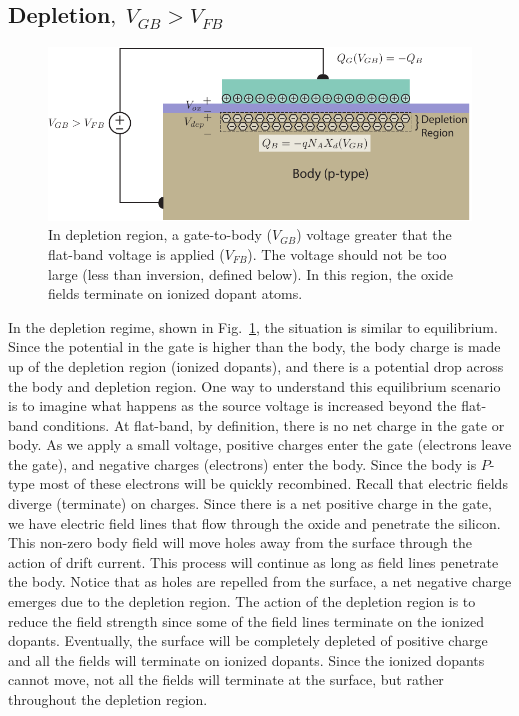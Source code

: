 \subsection{Depletion\texorpdfstring{$,\;V_{GB}>V_{FB}$}{}}
\begin{figure}[tbh]
\centering
\includegraphics[width=.75\columnwidth]{mos_cap_depletion}
\caption{In depletion region, a gate-to-body ($V_{GB}$) voltage greater that the flat-band voltage is applied ($V_{FB}$).  The voltage should not be too large (less than inversion, defined below).  In this region, the oxide fields terminate on ionized dopant atoms.}
\label{fig:mos_dep}
\end{figure}
In the depletion regime, shown in Fig.~\ref{fig:mos_dep}, the situation is similar to equilibrium.  Since the potential in the gate is higher than the body, the body charge is made up of the depletion region (ionized dopants), and there is a potential drop across the body and depletion region.  One way to understand this equilibrium scenario is to imagine what happens as the source voltage is increased beyond the flat-band conditions.  At flat-band, by definition, there is no net charge in the gate or body.  As we apply a small voltage, positive charges enter the gate (electrons leave the gate), and negative charges (electrons) enter the body. Since the body is $P$-type most of these electrons will be quickly recombined.  
Recall that electric fields diverge (terminate) on charges.  Since there is a net positive charge in the gate, we have electric field lines that flow through the oxide and penetrate the silicon.  This non-zero body field will move holes away from the surface through the action of drift current.  This process will continue as long as field lines penetrate the body.   Notice that as holes are repelled from the surface, a net negative charge emerges due to the depletion region.  The action of the depletion region is to reduce the field strength since some of the field lines terminate on the ionized dopants.  Eventually, the surface will be completely depleted of positive charge and all the fields will terminate on ionized dopants.  Since the ionized dopants cannot move, not all the fields will terminate at the surface, but rather throughout the depletion region.  

